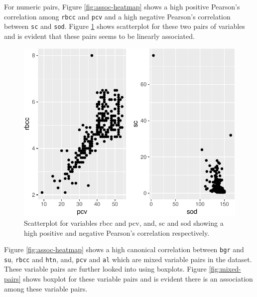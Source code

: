 For numeric pairs, Figure \ref{fig:assoc-heatmap} shows a high positive
Pearson's correlation among \texttt{rbcc} and \texttt{pcv} and a high
negative Pearson's correlation between \texttt{sc} and \texttt{sod}.
Figure \ref{fig:numeric-pairs} shows scatterplot for these two pairs of
variables and is evident that these pairs seems to be linearly
associated.

\begin{Schunk}
\begin{figure}

{\centering \includegraphics{rj_paper_files/figure-latex/numeric-pairs-1} 

}

\caption[Scatterplot for variables rbcc and pcv, and, sc and sod showing a high positive and negative Pearson's correlation respectively]{Scatterplot for variables rbcc and pcv, and, sc and sod showing a high positive and negative Pearson's correlation respectively.}\label{fig:numeric-pairs}
\end{figure}
\end{Schunk}

Figure \ref{fig:assoc-heatmap} shows a high canonical correlation
between \texttt{bgr} and \texttt{su}, \texttt{rbcc} and \texttt{htn},
and, \texttt{pcv} and \texttt{al} which are mixed variable pairs in the
dataset. These variable pairs are further looked into using boxplots.
Figure \ref{fig:mixed-pairs} shows boxplot for these variable pairs and
is evident there is an association among these variable pairs.

